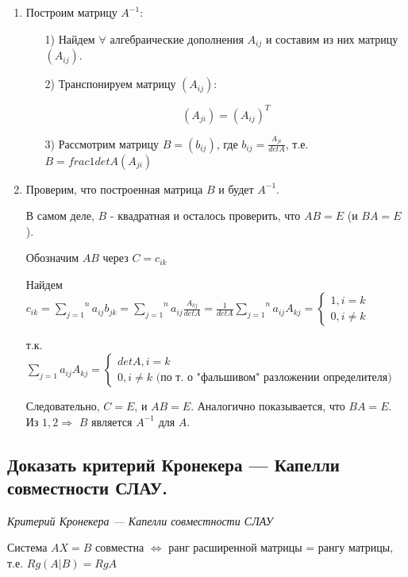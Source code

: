 \begin{enumerate}
    \item Построим матрицу $A^{-1}:$
    \begin{enumerate}
        \item[1)] Найдем $\forall$ алгебраические дополнения $A_{ij}$ и составим из них матрицу $(A_{ij})$.
        \item[2)] Транспонируем матрицу $(A_{ij}):$

    $$(A_{ji}) = (A_{ij})^T$$
        \item[3)] Рассмотрим матрицу $B = (b_{ij})$, где $b_{ij} = \frac{A_{ji}}{detA}$, т.е. $B = frac{1}{detA}(A_{ji})$
    \end{enumerate}
    \item Проверим, что построенная матрица $B$ и будет $A^{-1}$.

    В самом деле, $B$ - квадратная и осталось проверить, что $AB = E$ (и $BA = E$).

    Обозначим $AB$ через $C = c_{ik}$

    Найдем $c_{ik} = \overset{n}{\underset{j = 1}{\sum}}a_{ij}b_{jk} = \overset{n}{\underset{j = 1}{\sum}}a_{ij}\frac{A_{kj}}{detA} = \frac{1}{detA}\overset{n}{\underset{j = 1}{\sum}}a_{ij}A_{kj} = \begin{cases}1, i = k\\ 0, i \ne k\end{cases}$ 
    
    т.к. ${\underset{j = 1}{\sum}}a_{ij}A_{kj} = \begin{cases}detA, i = k\\ 0, i \ne k \text{ (по т. о "фальшивом"\ разложении определителя)}\end{cases}$

    Следовательно, $C = E$, и $AB = E$.
    Аналогично показывается, что $BA = E$.
    Из $1, 2 \Rightarrow$ $B$ является $A^{-1}$ для $A$.

\end{enumerate}

\ep

\subsection{Доказать критерий Кронекера — Капелли совместности СЛАУ.}
\textit{Критерий Кронекера — Капелли совместности СЛАУ}

\vspace*{15pt}

Система $AX = B$ совместна $\iff$ ранг расширенной матрицы = рангу матрицы, т.е. $Rg(A|B) = RgA$

